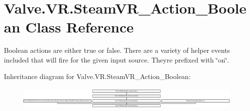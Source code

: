 \hypertarget{class_valve_1_1_v_r_1_1_steam_v_r___action___boolean}{}\section{Valve.\+V\+R.\+Steam\+V\+R\+\_\+\+Action\+\_\+\+Boolean Class Reference}
\label{class_valve_1_1_v_r_1_1_steam_v_r___action___boolean}


Boolean actions are either true or false. There are a variety of helper events included that will fire for the given input source. They\textquotesingle{}re prefixed with \char`\"{}on\char`\"{}.  


Inheritance diagram for Valve.\+V\+R.\+Steam\+V\+R\+\_\+\+Action\+\_\+\+Boolean\+:\begin{figure}[H]
\begin{center}
\leavevmode
\includegraphics[height=1.159420cm]{class_valve_1_1_v_r_1_1_steam_v_r___action___boolean}
\end{center}
\end{figure}
